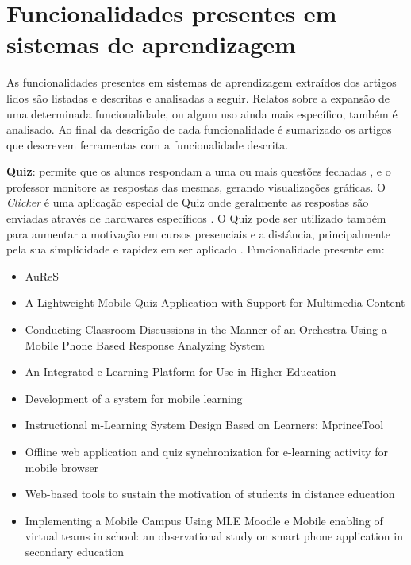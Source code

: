 \section{Funcionalidades presentes em sistemas de aprendizagem}
As funcionalidades presentes em sistemas de aprendizagem extraídos dos artigos lidos são listadas e descritas e analisadas a seguir. Relatos sobre a expansão de uma determinada funcionalidade, ou algum uso ainda mais específico, também é analisado. Ao final da descrição de cada funcionalidade é sumarizado os artigos que descrevem ferramentas com a funcionalidade descrita.

\textbf{Quiz}: permite que os alunos respondam a uma ou mais questões fechadas \cite{tokiwa_web-based_2009, ijtihadie_offline_2010, schmiedl_mobile_2010, covic_development_2010, schon_lightweight_2012}, e o professor monitore as respostas das mesmas, gerando visualizações gráficas. O \emph{Clicker} é uma aplicação especial de Quiz onde geralmente as respostas são enviadas através de hardwares específicos \cite{tokiwa_web-based_2009}. O Quiz pode ser utilizado também para aumentar a motivação em cursos presenciais e a distância, principalmente pela sua simplicidade e rapidez em ser aplicado \cite{tokiwa_web-based_2009}. Funcionalidade presente em:

\vspace{-5mm}
\begin{itemize}
\item AuReS \cite{jagar_auress:_2012}
\item A Lightweight Mobile Quiz Application with Support for Multimedia Content \cite{schon_lightweight_2012}
\item Conducting Classroom Discussions in the Manner of an Orchestra Using a Mobile Phone Based Response Analyzing System \cite{nakai_conducting_2007}
\item An Integrated e-Learning Platform for Use in Higher Education \cite{florea_integrated_2011}
\item Development of a system for mobile learning \cite{covic_development_2010}
\item Instructional m-Learning System Design Based on Learners: MprinceTool \cite{fardoun_instructional_2010}
\item Offline web application and quiz synchronization for e-learning activity for mobile browser \cite{ijtihadie_offline_2010}
\item Web-based tools to sustain the motivation of students in distance education \cite{tokiwa_web-based_2009}
\item Implementing a Mobile Campus Using MLE Moodle \cite{xhafa_implementing_2010} e Mobile enabling of virtual teams in school: an observational study on smart phone application in secondary education \cite{schmiedl_mobile_2010}
\end{itemize}

